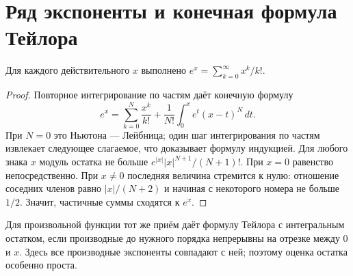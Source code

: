 
\section*{Ряд экспоненты и конечная формула Тейлора}
\begin{theorem}
Для каждого действительного \(x\) выполнено \(e^x=\sum_{k=0}^\infty x^k/k!\).
\end{theorem}
\begin{proof}Повторное интегрирование по частям даёт конечную формулу
\[
e^x=\sum_{k=0}^N\frac{x^k}{k!}+\frac1{N!}\int_0^x e^t(x-t)^N\,dt.
\]
При \(N=0\) это Ньютона — Лейбница; один шаг интегрирования по частям извлекает следующее слагаемое, что доказывает формулу индукцией. Для любого знака \(x\) модуль остатка не больше \(e^{|x|}|x|^{N+1}/(N+1)!\). При \(x=0\) равенство непосредственно. При \(x\ne0\) последняя величина стремится к нулю: отношение соседних членов равно \(|x|/(N+2)\) и начиная с некоторого номера не больше \(1/2\). Значит, частичные суммы сходятся к \(e^x\).\end{proof}
Для произвольной функции тот же приём даёт формулу Тейлора с интегральным остатком, если производные до нужного порядка непрерывны на отрезке между \(0\) и \(x\). Здесь все производные экспоненты совпадают с ней; поэтому оценка остатка особенно проста.
